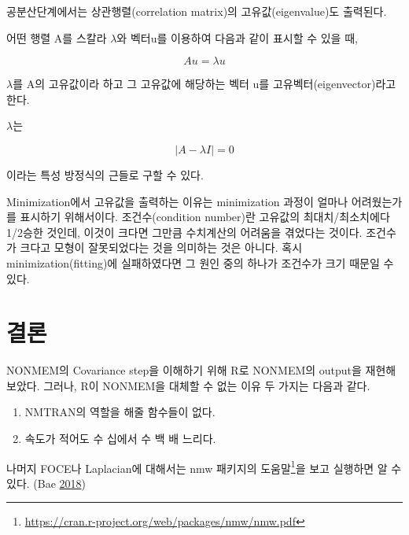 \documentclass[
  10pt,
  krantz2,
  a4paper]{krantz}
\providecommand{\tightlist}{%
  \setlength{\itemsep}{0pt}\setlength{\parskip}{0pt}}
\theoremstyle{definition}
\theoremstyle{definition}
\theoremstyle{definition}
\theoremstyle{remark}
\begin{document}
공분산단계에서는 상관행렬(correlation matrix)의 고유값(eigenvalue)도 출력된다.

어떤 행렬 A를 스칼라 \(\lambda\)와 벡터u를 이용하여 다음과 같이 표시할 수 있을 때,

\begin{equation}
Au = \lambda u
\label{eq:au-lu}
\end{equation}

\(\lambda\)를 A의 고유값이라 하고 그 고유값에 해당하는 벡터 u를 고유벡터(eigenvector)라고 한다.

\(\lambda\)는

\begin{equation}
\left| A - \lambda I \right| = 0
\label{eq:a-li-zero}
\end{equation}

이라는 특성 방정식의 근들로 구할 수 있다.

Minimization에서 고유값을 출력하는 이유는 minimization 과정이 얼마나 어려웠는가를 표시하기 위해서이다. 조건수(condition number)란 고유값의 최대치/최소치에다 1/2승한 것인데, 이것이 크다면 그만큼 수치계산의 어려움을 겪었다는 것이다. 조건수가 크다고 모형이 잘못되었다는 것을 의미하는 것은 아니다. 혹시 minimization(fitting)에 실패하였다면 그 원인 중의 하나가 조건수가 크기 때문일 수 있다.

\hypertarget{uxacb0uxb860}{%
\section{결론}\label{uxacb0uxb860}}

NONMEM의 Covariance step을 이해하기 위해 R로 NONMEM의 output을 재현해 보았다. 그러나, R이 NONMEM을 대체할 수 없는 이유 두 가지는 다음과 같다.

\begin{enumerate}
\def\labelenumi{\arabic{enumi}.}
\tightlist
\item
  NMTRAN의 역할을 해줄 함수들이 없다.
\item
  속도가 적어도 수 십에서 수 백 배 느리다.
\end{enumerate}

나머지 FOCE나 Laplacian에 대해서는 nmw 패키지의 도움말\footnote{\url{https://cran.r-project.org/web/packages/nmw/nmw.pdf}}을 보고 실행하면 알 수 있다. (Bae \protect\hyperlink{ref-R-nmw}{2018})
\end{document}

